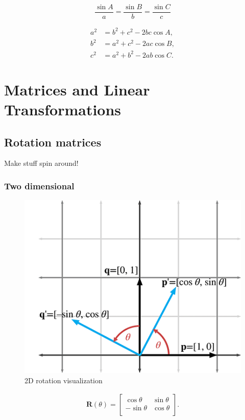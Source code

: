 \documentclass[11pt]{article}
\begin{document}
$$\frac{\sin A}{a}=\frac{\sin B}{b}=\frac{\sin C}{c}$$

\begin{align*}
a^2 &= b^2 + c^2 - 2bc\cos A, \\
b^2 &= a^2 + c^2 - 2ac\cos B, \\
c^2 &= a^2 + b^2 - 2ab\cos C.
\end{align*}

\newpage	
\section{Matrices and Linear Transformations}

\subsection{Rotation matrices}

Make stuff spin around!

\subsubsection{Two dimensional}

\begin{figure}[H]
\centering
    \includegraphics{05_2d_rotation}
\caption{2D rotation visualization}
\label{fig:2d-rotation-visualization}
\end{figure}

$$
\begin{matrix}
{\mathbf{R}(\theta) =
\begin{bmatrix}
{\cos\theta} & {\sin\theta} \\
{- \sin\theta} & {\cos\theta} \\
\end{bmatrix}.} \\
\end{matrix}
$$
\end{document}
